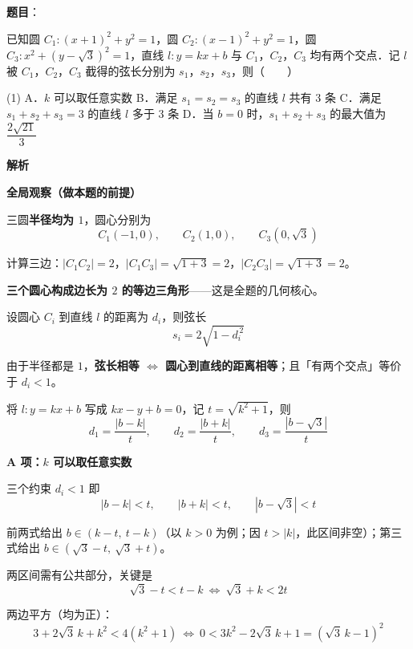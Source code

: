 \begin{answer}

\textbf{题目}：

已知圆 $C_1:(x+1)^2+y^2=1$，圆 $C_2:(x-1)^2+y^2=1$，圆 $C_3:x^2+(y-\sqrt{3})^2=1$，直线 $l:y=kx+b$ 与 $C_1$，$C_2$，$C_3$ 均有两个交点．记 $l$ 被 $C_1$，$C_2$，$C_3$ 截得的弦长分别为 $s_1$，$s_2$，$s_3$，则\mbox{（　　）}

\begin{gkopts}(1)
\task A．$k$ 可以取任意实数
\task B．满足 $s_1=s_2=s_3$ 的直线 $l$ 共有 $3$ 条
\task C．满足 $s_1+s_2+s_3=3$ 的直线 $l$ 多于 $3$ 条
\task D．当 $b=0$ 时，$s_1+s_2+s_3$ 的最大值为 $\dfrac{2\sqrt{21}}{3}$
\end{gkopts}

\textbf{解析}

\textbf{全局观察（做本题的前提）}

三圆\textbf{半径均为 $1$}，圆心分别为
\nopagebreak[4]
\[C_1(-1,0),\qquad C_2(1,0),\qquad C_3(0,\sqrt3)\]

计算三边：$|C_1C_2|=2$，$|C_1C_3|=\sqrt{1+3}=2$，$|C_2C_3|=\sqrt{1+3}=2$。

\textbf{三个圆心构成边长为 $2$ 的等边三角形}——这是全题的几何核心。

设圆心 $C_i$ 到直线 $l$ 的距离为 $d_i$，则弦长
\nopagebreak[4]
\[s_i=2\sqrt{1-d_i^{\,2}}\]

由于半径都是 $1$，\textbf{弦长相等 $\iff$ 圆心到直线的距离相等}；且「有两个交点」等价于 $d_i<1$。

将 $l:y=kx+b$ 写成 $kx-y+b=0$，记 $t=\sqrt{k^2+1}$，则
\nopagebreak[4]
\[d_1=\frac{|b-k|}{t},\qquad d_2=\frac{|b+k|}{t},\qquad d_3=\frac{|b-\sqrt3|}{t}\]

\par\medskip

\textbf{A 项：$k$ 可以取任意实数}

三个约束 $d_i<1$ 即
\nopagebreak[4]
\[|b-k|<t,\qquad |b+k|<t,\qquad |b-\sqrt3|<t\]

前两式给出 $b\in(k-t,\ t-k)$（以 $k>0$ 为例；因 $t>|k|$，此区间非空）；第三式给出 $b\in(\sqrt3-t,\ \sqrt3+t)$。

两区间需有公共部分，关键是
\nopagebreak[4]
\[\sqrt3-t<t-k\ \Longleftrightarrow\ \sqrt3+k<2t\]

两边平方（均为正）：
\nopagebreak[4]
\[3+2\sqrt3\,k+k^2<4\left(k^2+1\right)\ \Longleftrightarrow\ 0<3k^2-2\sqrt3\,k+1=\left(\sqrt3\,k-1\right)^2\]


\end{answer}
